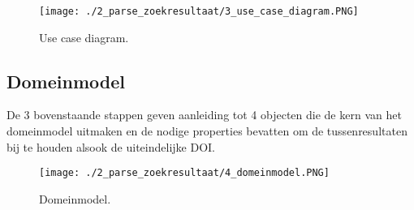 \begin{figure}[h!]
    \centering
    \texttt{[image: ./2\_parse\_zoekresultaat/3\_use\_case\_diagram.PNG]}
    \caption[Use case diagram.]{\label{fig:Use case diagram}Use case diagram.}
\end{figure}
\subsection{Domeinmodel}
De 3 bovenstaande stappen geven aanleiding tot 4 objecten die de kern van het domeinmodel uitmaken en de nodige properties bevatten om de tussenresultaten bij te houden alsook de uiteindelijke DOI.
\begin{figure}[h!]
    \centering
    \texttt{[image: ./2\_parse\_zoekresultaat/4\_domeinmodel.PNG]}
    \caption[Domeinmodel.]{\label{fig:Domeinmodel}Domeinmodel.}
\end{figure}
\newpage

